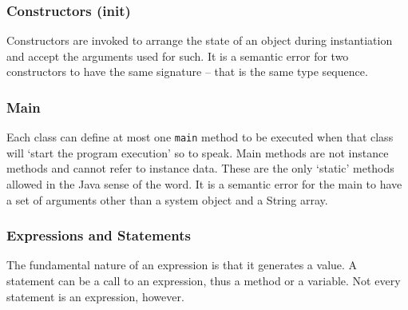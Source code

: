\subsubsection{Constructors (init)}
Constructors are invoked to arrange the state of an object during instantiation and accept the arguments used for such. It is a semantic error for two constructors to have the same signature -- that is the same type sequence.

\subsubsection{Main}
Each class can define at most one \verb!main! method to be executed when that class will `start the program execution' so to speak. Main methods are not instance methods and cannot refer to instance data. These are the only `static' methods allowed in the Java sense of the word. It is a semantic error for the main to have a set of arguments other than a system object and a String array.

\subsubsection{Expressions and Statements}
The fundamental nature of an expression is that it generates a value. A statement can be a call to an expression, thus a method or a variable. Not every statement is an expression, however.
